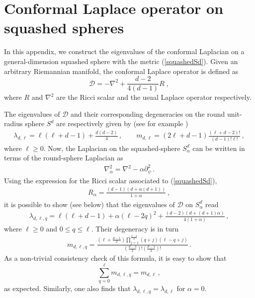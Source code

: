 \documentclass[12pt]{article}
\numberwithin{equation}{section}
\newcommand{\req}[1]{(\ref{#1})} %
\begin{document}
 

 
\section{Conformal Laplace operator on squashed spheres}
\label{ssgd}

In this appendix, we construct the eigenvalues of the conformal Laplacian on a general-dimension squashed sphere with the metric \req{squashedSd}.
Given an arbitrary Riemannian manifold, the conformal Laplace operator is defined as
%
\begin{equation}
\mathcal{D} = -\nabla^2 +\frac{d-2}{4(d-1)} R\;,
\end{equation}
%
where $R$ and $\nabla^2$ are the Ricci scalar and the usual Laplace operator respectively.

The eigenvalues of $\mathcal{D}$ and their corresponding degeneracies on the round unit-radius sphere $S^d$ are respectively given by (see for example \cite{Klebanov:2011gs})
%
\begin{align}
\lambda_{d,\ell}=\ell(\ell+d-1)+\frac{d(d-2)}{4}\, , \qquad m_{d,\ell}=(2\ell+d-1)\frac{(\ell+d-2)!}{(d-1)!\ell!}\, ,\label{eigenround}
\end{align}
where $\ell \geq 0$.
%
Now, the Laplacian on the squashed-sphere $S_{\alpha}^d$ can be written in terms of the round-sphere Laplacian as
%
\begin{align}
\nabla^2_{\alpha} = \nabla^2 -\alpha \partial_{\psi}^2\, .\label{Lapsq}
\end{align}
%
Using the expression for the Ricci scalar associated to \req{squashedSd},
%
\begin{align}
R_{\alpha} =\frac{(d-1)(d+\alpha(d+1))}{1+\alpha} \, ,\label{Riccisq}
\end{align}
%
it is possible to show (see below) that the eigenvalues of $\mathcal{D}$ on $S^d_{\alpha}$ read
%
\begin{align}
\lambda_{d,\ell,q}=\ell(\ell+d-1)+\alpha(\ell-2q)^2+\frac{(d-2)(d+(d+1)\alpha)}{4(1+\alpha)}\, ,\label{eigensq}
\end{align}
%
where $\ell\geq0$ and $0\leq q\leq \ell$. Their degeneracy is in turn
%
\begin{align}
m_{d,\ell,q}=\frac{\left(\ell+\frac{d-1}{2}\right)\prod\limits_{j=1}^{\frac{d-3}{2}}(q+j)(\ell-q+j)}{\left(\frac{d-3}{2}\right)!\left(\frac{d-1}{2}\right)!}\, .\label{degesq}
\end{align}
%
As a non-trivial consistency check of this formula, it is easy to show that
%
\begin{equation}
\sum_{q=0}^{\ell} m_{d,\ell,q} = m_{d,\ell}\,,
\end{equation}
%
as expected.
Similarly, one also finds that $\lambda_{d,\ell,q}=\lambda_{d,\ell}$ for $\alpha=0$.
\end{document}

